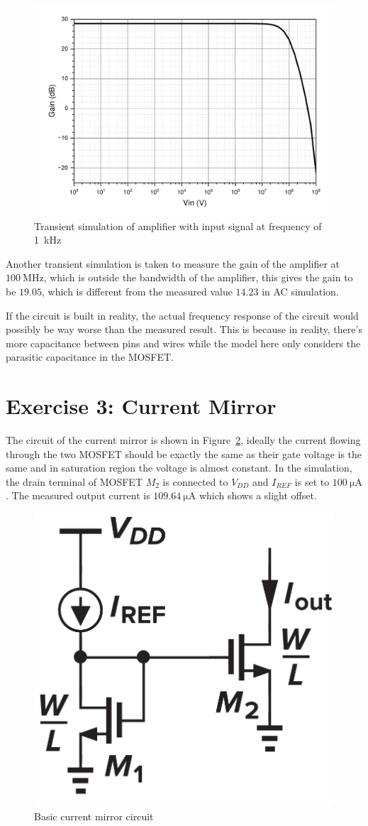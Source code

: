 \documentclass[12pt]{article}   %
\begin{document}
	\begin{figure}[htbp]
		\centering
		\includegraphics[width=0.7\linewidth]{Figures/E2_Inverting_Amplifier/AC_analysis}
		\caption{Transient simulation of amplifier with input signal at frequency of \SI{1}{\kilo\hertz}}
		\label{fig:ac_analysis_inv}
	\end{figure}
	
	Another transient simulation is taken to measure the gain of the amplifier at $\SI{100}{\mega\hertz}$, which is outside the bandwidth of the amplifier, this gives the gain to be $19.05$, which is different from the measured value $14.23$ in AC simulation.
	
	If the circuit is built in reality, the actual frequency response of the circuit would possibly be way worse than the measured result. This is because in reality, there's more capacitance between pins and wires while the model here only considers the parasitic capacitance in the MOSFET.
	
	\newpage
	
	\section{Exercise 3: Current Mirror}
	
	The circuit of the current mirror is shown in Figure~\ref{fig:currentMirror}, ideally the current flowing through the two MOSFET should be exactly the same as their gate voltage is the same and in saturation region the voltage is almost constant. In the simulation, the drain terminal of MOSFET $M_2$ is connected to $V_{DD}$ and $I_{REF}$ is set to $\SI{100}{\micro\ampere}$. The measured output current is $\SI{109.64}{\micro\ampere}$ which shows a slight offset.
	
	\begin{figure}[htbp]
		\centering
		\includegraphics[width=0.35\linewidth]{Figures/E3_Current_Mirror/current_mirror}
		\caption{Basic current mirror circuit}
		\label{fig:currentMirror}
	\end{figure}
	
\end{document}
